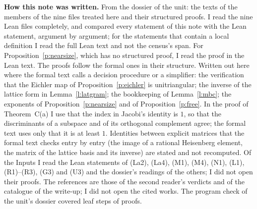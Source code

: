 \documentclass[11pt,a4paper]{article}
\newcommand{\subhead}[1]{\par\addvspace{9pt plus 2pt}\Needspace{4\baselineskip}\noindent\textbf{#1}\enspace\ignorespaces}
\theoremstyle{plainx}
\theoremstyle{uprightx}
\begin{document}
\subhead{How this note was written.} From the dossier of the unit: the texts of the members of the nine files
treated here and their structured proofs. I read the nine Lean files completely, and compared every statement of
this note with the Lean statement, argument by argument; for the statements that contain a local definition I read
the full Lean text and not the census's span. For Proposition~\ref{p:nearsize}, which has no structured proof, I
read the proof in the Lean text. The proofs follow the formal ones in their structure. Written out here where the
formal text calls a decision procedure or a simplifier: the verification that the Eichler map of
Proposition~\ref{p:eichler} is unitriangular; the inverse of the lattice form in Lemma~\ref{l:latgram}; the
bookkeeping of Lemma~\ref{l:mbc}; the exponents of Proposition~\ref{p:nearsize} and of Proposition~\ref{p:free}. In
the proof of Theorem~C(a) I use that the index in Jacobi's identity is $1$, so that the discriminants of a subspace
and of its orthogonal complement agree; the formal text uses only that it is at least $1$. Identities between
explicit matrices that the formal text checks entry by entry (the image of a rational Heisenberg element, the
matrix of the lattice basis and its inverse) are stated and not recomputed. Of the Inputs I read the Lean
statements of (La2), (La4), (M1), (M4), (N1), (L1), (R1)--(R3), (G3) and (U3) and the dossier's readings of the
others; I did not open their proofs. The references are those of the second reader's verdicts and of the catalogue
of the write-up; I did not open the cited works. The program check of the unit's dossier covered \UnitSteps{} leaf
steps of \UnitProofs{} proofs.
\end{document}
